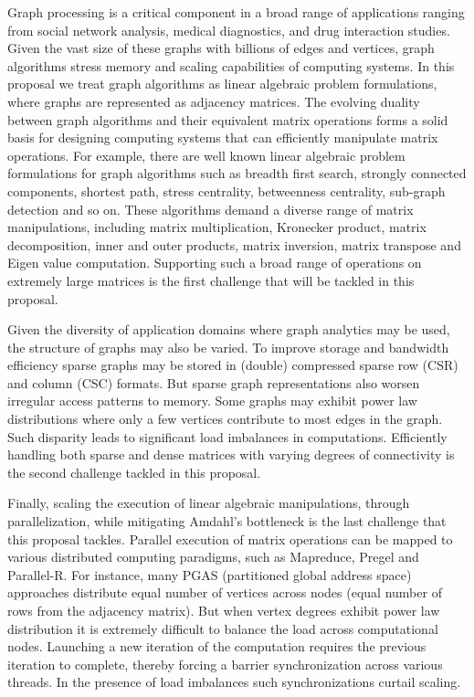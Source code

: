 \noindent
Graph processing is a critical component in a broad range of applications ranging from  social network analysis, medical diagnostics, and drug interaction studies.  Given the vast size of these graphs with billions of edges and vertices, graph algorithms stress memory and scaling capabilities of computing systems. In this proposal we treat graph algorithms as linear algebraic problem formulations, where graphs are represented as adjacency matrices.  The evolving duality between graph algorithms and their equivalent matrix operations forms a solid basis for designing computing systems that can efficiently manipulate matrix operations.  For example, there are well known linear algebraic problem formulations for graph algorithms such as breadth first search, strongly connected components, shortest path, stress centrality, betweenness centrality,  sub-graph detection and so on.  These algorithms demand a diverse range of matrix manipulations, including matrix multiplication, Kronecker product,  matrix decomposition, inner and outer products, matrix inversion, matrix transpose and Eigen value computation.  Supporting such a broad range of operations on extremely large matrices is the first challenge that will be tackled in this proposal. 

Given the diversity of application domains where graph analytics may be used, the structure of graphs may also be varied. To improve storage and bandwidth efficiency sparse graphs may be stored in  (double) compressed sparse row (CSR) and column (CSC) formats. But sparse graph representations also worsen irregular access patterns to memory. Some graphs may exhibit power law distributions where only a few vertices contribute to most edges in the graph. Such disparity leads to significant load imbalances in computations.  Efficiently handling both sparse and dense matrices with varying degrees of connectivity is the second challenge tackled in this proposal. 
 
Finally, scaling the execution of linear algebraic manipulations, through parallelization, while mitigating Amdahl's bottleneck is the last challenge that this proposal tackles. Parallel execution of matrix operations can be mapped to various distributed computing paradigms, such as Mapreduce, Pregel and Parallel-R. For instance, many PGAS (partitioned global address space) approaches distribute equal number of vertices across nodes (equal number of rows from the adjacency matrix). 
But when vertex degrees exhibit power law distribution it  is extremely difficult to balance the load across computational nodes. Launching a  new iteration of the computation  requires the previous iteration to complete, thereby forcing a barrier synchronization across various threads. In the presence of load imbalances such synchronizations curtail scaling. 

